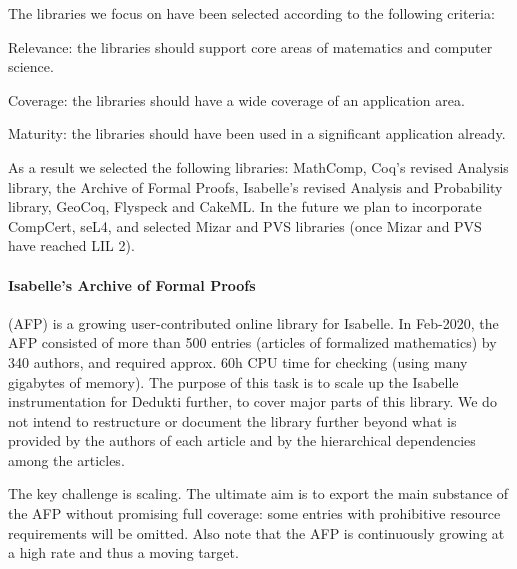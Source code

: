 The libraries we focus on have been selected according to the
following criteria:
\begin{compactitem}
\item Relevance: the libraries should support core areas of matematics and computer science.
\item Coverage: the libraries should have a wide coverage of an application area.
\item Maturity: the libraries should have been used in a significant application already.
\end{compactitem}
As a result we selected the following libraries: MathComp, Coq's revised
Analysis library, the Archive of Formal Proofs, Isabelle's revised Analysis and Probability library,
GeoCoq, Flyspeck and CakeML. In the future we plan to incorporate
CompCert, seL4, and selected Mizar and PVS libraries (once Mizar and
PVS have reached LIL 2).

\paragraph*{Isabelle's Archive of Formal Proofs} (AFP) \cite{isabelle-afp} is a
growing user-contributed online library for Isabelle. In Feb-2020, the
AFP consisted of more than 500 entries (articles of formalized
mathematics) by 340 authors, and required approx. 60h CPU time for
checking (using many gigabytes of memory).  The purpose of this task
is to scale up the Isabelle instrumentation for Dedukti further, to
cover major parts of this library. We do not intend to restructure or
document the library further beyond what is provided by the authors of
each article and by the hierarchical dependencies among the articles.

The key challenge is scaling. The ultimate aim is to export the main
substance of the AFP without promising full coverage: some entries
with prohibitive resource requirements will be omitted. Also note that
the AFP is continuously growing at a high rate and thus a moving
target.

